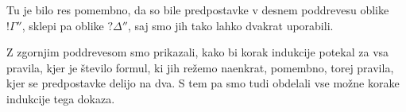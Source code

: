 \dol
\begin{prooftree} \footnotesize


\end{prooftree}
Tu je bilo res pomembno, da so bile predpostavke v desnem poddrevesu oblike $!\Gamma''$, sklepi pa oblike $?\Delta''$, saj smo jih tako lahko dvakrat uporabili.

Z zgornjim poddrevesom smo prikazali, kako bi korak indukcije potekal za vsa pravila, kjer je število formul, ki jih režemo naenkrat, pomembno, torej pravila, kjer se predpostavke delijo na dva. S tem pa smo tudi obdelali vse možne korake indukcije tega dokaza.
